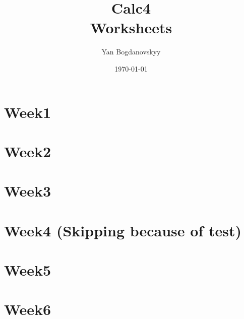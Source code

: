 \documentclass{report}
\title{\Huge{Calc4}\\ Worksheets}
\author{\huge{Yan Bogdanovskyy}}
\date{\today}
\begin{document}
\maketitle
\tableofcontents
\pagebreak

\begin{multicols}{2}
\chapter{Week1}


\chapter{Week2}


\chapter{Week3}


\chapter{Week4 (Skipping because of test) }
\chapter{Week5}


\chapter{Week6}


\end{multicols}
\end{document}
